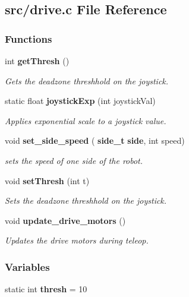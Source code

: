 \subsection{src/drive.c File Reference}
\label{drive_8c}
\subsubsection*{Functions}
\begin{DoxyCompactItemize}
\item 
int \textbf{ get\+Thresh} ()
\begin{DoxyCompactList}\small\item\em Gets the deadzone threshhold on the joystick. \end{DoxyCompactList}\item 
static float \textbf{ joystick\+Exp} (int joystick\+Val)
\begin{DoxyCompactList}\small\item\em Applies exponential scale to a joystick value. \end{DoxyCompactList}\item 
void \textbf{ set\+\_\+side\+\_\+speed} (\textbf{ side\+\_\+t} \textbf{ side}, int speed)
\begin{DoxyCompactList}\small\item\em sets the speed of one side of the robot. \end{DoxyCompactList}\item 
void \textbf{ set\+Thresh} (int t)
\begin{DoxyCompactList}\small\item\em Sets the deadzone threshhold on the joystick. \end{DoxyCompactList}\item 
void \textbf{ update\+\_\+drive\+\_\+motors} ()
\begin{DoxyCompactList}\small\item\em Updates the drive motors during teleop. \end{DoxyCompactList}\end{DoxyCompactItemize}
\subsubsection*{Variables}
\begin{DoxyCompactItemize}
\item 
static int \textbf{ thresh} = 10
\end{DoxyCompactItemize}


